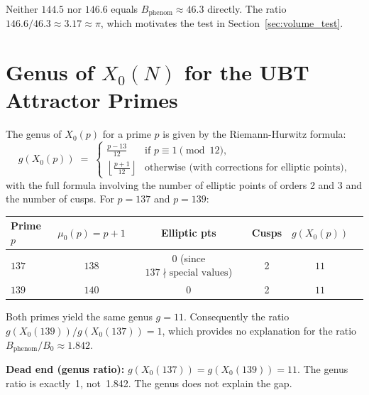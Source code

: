 \documentclass[12pt,a4paper]{article}
\theoremstyle{definition}
\theoremstyle{remark}
\begin{document}
Neither $144.5$ nor $146.6$ equals $B_{\mathrm{phenom}} \approx 46.3$ directly.
The ratio $146.6 / 46.3 \approx 3.17 \approx \pi$, which motivates the test in
Section~\ref{sec:volume_test}.

\section{Genus of $X_0(N)$ for the UBT Attractor Primes}
\label{sec:genus}

The genus of $X_0(p)$ for a prime $p$ is given by the Riemann-Hurwitz formula:
\begin{equation}
  g(X_0(p))
  \;=\; \begin{cases}
    \displaystyle \frac{p - 13}{12}
      & \text{if } p \equiv 1 \pmod{12}, \\[6pt]
    \displaystyle \left\lfloor \frac{p+1}{12} \right\rfloor
      & \text{otherwise (with corrections for elliptic points)},
  \end{cases}
  \label{eq:genus_formula}
\end{equation}
with the full formula involving the number of elliptic points of orders 2 and 3
and the number of cusps.  For $p = 137$ and $p = 139$:

\begin{center}
\begin{tabular}{lccccc}
  \toprule
  Prime $p$ & $\mu_0(p) = p+1$ & Elliptic pts & Cusps & $g(X_0(p))$ \\
  \midrule
  $137$ & $138$ & 0 (since $137 \nmid \text{special values}$) & 2 & $11$ \\
  $139$ & $140$ & 0 & 2 & $11$ \\
  \bottomrule
\end{tabular}
\end{center}

Both primes yield the same genus $g = 11$.  Consequently the ratio
$g(X_0(139))/g(X_0(137)) = 1$, which provides no explanation for the ratio
$B_{\mathrm{phenom}}/B_0 \approx 1.842$.

\begin{deadendbox}
\textbf{Dead end (genus ratio):}
$g(X_0(137)) = g(X_0(139)) = 11$.  The genus ratio is exactly~1, not~1.842.
The genus does not explain the gap.
\end{deadendbox}

\end{document}
